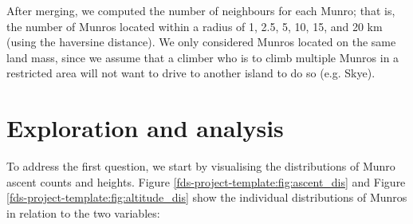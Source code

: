 \documentclass[11pt,a4paper]{article}
\begin{document}
After merging, we computed the number of neighbours for each Munro; that is, the number of Munros located within a radius of 1, 2.5, 5, 10, 15, and 20 km (using the haversine distance). We only considered Munros located on the same land mass, since we assume that a climber who is to climb multiple Munros in a restricted area will not want to drive to another island to do so (e.g. Skye).

\section{Exploration and  analysis}

To address the first question, we start by visualising the distributions of Munro ascent counts and heights. Figure \ref{fds-project-template:fig:ascent_dis} and Figure \ref{fds-project-template:fig:altitude_dis} show the individual distributions of Munros in relation to the two variables:
\end{document}
